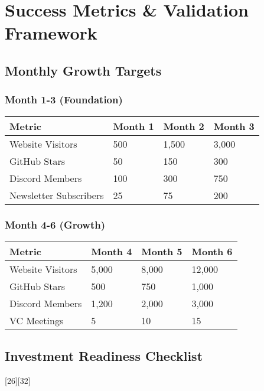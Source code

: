 \documentclass[12pt,a4paper]{article}
\begin{document}
\section{Success Metrics \& Validation Framework}

\subsection{Monthly Growth Targets}

\subsubsection{Month 1-3 (Foundation)}
\begin{center}
\begin{tabular}{|l|l|l|l|}
\hline
\textbf{Metric} & \textbf{Month 1} & \textbf{Month 2} & \textbf{Month 3} \\
\hline
Website Visitors & 500 & 1,500 & 3,000 \\
GitHub Stars & 50 & 150 & 300 \\
Discord Members & 100 & 300 & 750 \\
Newsletter Subscribers & 25 & 75 & 200 \\
\hline
\end{tabular}
\end{center}

\subsubsection{Month 4-6 (Growth)}
\begin{center}
\begin{tabular}{|l|l|l|l|}
\hline
\textbf{Metric} & \textbf{Month 4} & \textbf{Month 5} & \textbf{Month 6} \\
\hline
Website Visitors & 5,000 & 8,000 & 12,000 \\
GitHub Stars & 500 & 750 & 1,000 \\
Discord Members & 1,200 & 2,000 & 3,000 \\
VC Meetings & 5 & 10 & 15 \\
\hline
\end{tabular}
\end{center}

\subsection{Investment Readiness Checklist}[26][32]
\end{document}

